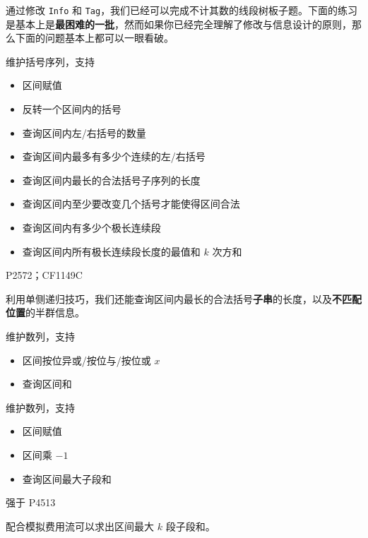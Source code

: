 通过修改 \texttt{Info} 和 \texttt{Tag}，我们已经可以完成不计其数的线段树板子题。下面的练习是基本上是\textbf{最困难的一批}，然而如果你已经完全理解了修改与信息设计的原则，那么下面的问题基本上都可以一眼看破。

\begin{exercise}[括号序列]
    维护括号序列，支持
    \begin{itemize}
        \item 区间赋值
        \item 反转一个区间内的括号
        \item 查询区间内左/右括号的数量
        \item 查询区间内最多有多少个连续的左/右括号
        \item 查询区间内最长的合法括号子序列的长度
        \item 查询区间内至少要改变几个括号才能使得区间合法
        \item 查询区间内有多少个极长连续段
        \item 查询区间内所有极长连续段长度的最值和 $k$ 次方和
    \end{itemize}
    P2572；CF1149C
\end{exercise}
\begin{remark}
    利用单侧递归技巧，我们还能查询区间内最长的合法括号\textbf{子串}的长度，以及\textbf{不匹配位置}的半群信息。
\end{remark}

\begin{exercise}[拆位]
    维护数列，支持
    \begin{itemize}
        \item 区间按位异或/按位与/按位或 $x$
        \item 查询区间和
    \end{itemize}
\end{exercise}

\begin{exercise}[区间最大子段和]
    维护数列，支持
    \begin{itemize}
        \item 区间赋值
        \item 区间乘 $-1$
        \item 查询区间最大子段和
    \end{itemize}
    强于 P4513
\end{exercise}
\begin{remark}
    配合模拟费用流可以求出区间最大 $k$ 段子段和。
\end{remark}

